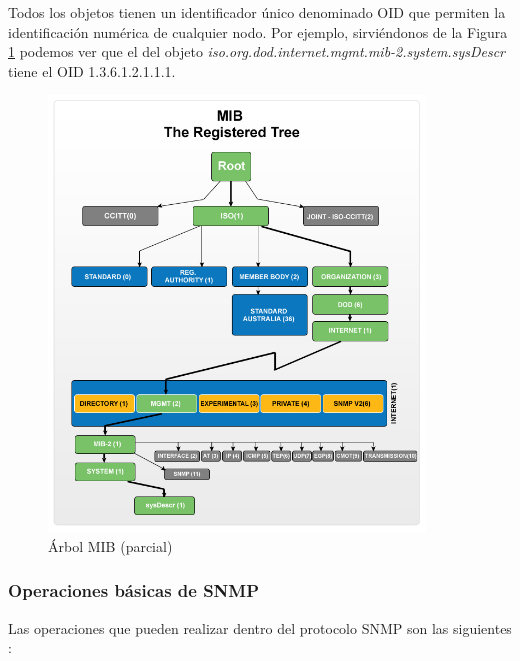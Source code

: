 Todos los objetos tienen un identificador único denominado OID que permiten la identificación numérica
de cualquier nodo. Por ejemplo, sirviéndonos de la Figura \ref{fig:mib_tree} podemos ver que el del
objeto \textit{iso.org.dod.internet.mgmt.mib-2.system.sysDescr} tiene el OID 1.3.6.1.2.1.1.1.

\begin{figure}[ht]
    \centering
    \includegraphics[width=10cm]{graphics/mib-oid-tree}
    \caption{Árbol MIB (parcial)}
    \label{fig:mib_tree}
\end{figure}

\subsubsection{Operaciones básicas de SNMP}

Las operaciones que pueden realizar dentro del protocolo SNMP son las siguientes
\cite{mauro2005essential}:

